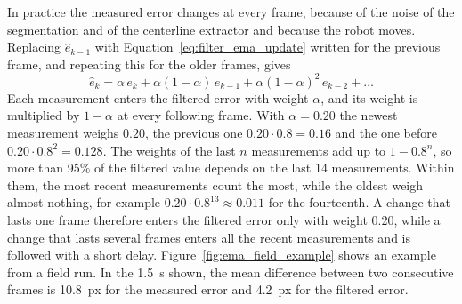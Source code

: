 In practice the measured error changes at every frame, because of the noise of the segmentation and of the centerline extractor and because the robot moves. Replacing $\hat{e}_{k-1}$ with Equation~\eqref{eq:filter_ema_update} written for the previous frame, and repeating this for the older frames, gives
\begin{equation}
    \hat{e}_k = \alpha\, e_k + \alpha (1-\alpha)\, e_{k-1} + \alpha (1-\alpha)^2\, e_{k-2} + \dots
    \label{eq:ema_weights}
\end{equation}
Each measurement enters the filtered error with weight $\alpha$, and its weight is multiplied by $1-\alpha$ at every following frame. With $\alpha = 0.20$ the newest measurement weighs $0.20$, the previous one $0.20 \cdot 0.8 = 0.16$ and the one before $0.20 \cdot 0.8^2 = 0.128$. The weights of the last $n$ measurements add up to $1 - 0.8^{n}$, so more than 95\% of the filtered value depends on the last 14 measurements. Within them, the most recent measurements count the most, while the oldest weigh almost nothing, for example $0.20 \cdot 0.8^{13} \approx 0.011$ for the fourteenth. A change that lasts one frame therefore enters the filtered error only with weight 0.20, while a change that lasts several frames enters all the recent measurements and is followed with a short delay. Figure~\ref{fig:ema_field_example} shows an example from a field run. In the 1.5~s shown, the mean difference between two consecutive frames is 10.8~px for the measured error and 4.2~px for the filtered error.

